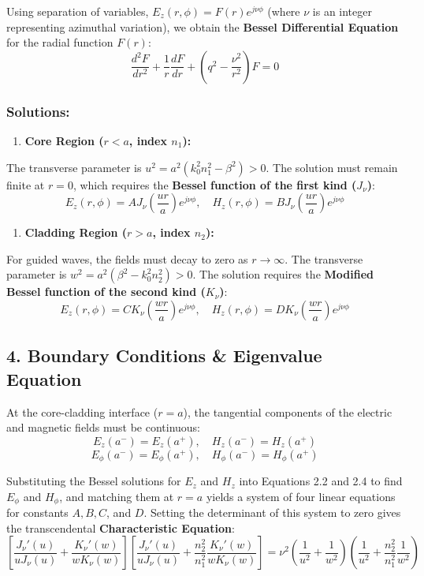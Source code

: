Using separation of variables, $E_z(r, \phi) = F(r) e^{j\nu\phi}$ (where $\nu$ is an integer representing azimuthal variation), we obtain the \textbf{Bessel Differential Equation} for the radial function $F(r)$:
\[ \frac{d^2 F}{dr^2} + \frac{1}{r}\frac{dF}{dr} + \left(q^2 - \frac{\nu^2}{r^2}\right) F = 0 \]

\subsubsection{Solutions:}
\begin{enumerate}
  \item \textbf{Core Region ($r < a$, index $n_1$):}
\end{enumerate}
    The transverse parameter is $u^2 = a^2(k_0^2 n_1^2 - \beta^2) > 0$. The solution must remain finite at $r=0$, which requires the \textbf{Bessel function of the first kind ($J_\nu$)}:
    \[ E_z(r, \phi) = A J_\nu\left(\frac{u r}{a}\right) e^{j\nu\phi}, \quad H_z(r, \phi) = B J_\nu\left(\frac{u r}{a}\right) e^{j\nu\phi} \]
\begin{enumerate}
  \item \textbf{Cladding Region ($r > a$, index $n_2$):}
\end{enumerate}
    For guided waves, the fields must decay to zero as $r \to \infty$. The transverse parameter is $w^2 = a^2(\beta^2 - k_0^2 n_2^2) > 0$. The solution requires the \textbf{Modified Bessel function of the second kind ($K_\nu$)}:
    \[ E_z(r, \phi) = C K_\nu\left(\frac{w r}{a}\right) e^{j\nu\phi}, \quad H_z(r, \phi) = D K_\nu\left(\frac{w r}{a}\right) e^{j\nu\phi} \]


\subsection{4. Boundary Conditions \& Eigenvalue Equation}
At the core-cladding interface ($r = a$), the tangential components of the electric and magnetic fields must be continuous:
\[ E_z(a^-) = E_z(a^+), \quad H_z(a^-) = H_z(a^+) \]
\[ E_\phi(a^-) = E_\phi(a^+), \quad H_\phi(a^-) = H_\phi(a^+) \]

Substituting the Bessel solutions for $E_z$ and $H_z$ into Equations 2.2 and 2.4 to find $E_\phi$ and $H_\phi$, and matching them at $r = a$ yields a system of four linear equations for constants $A, B, C$, and $D$. Setting the determinant of this system to zero gives the transcendental \textbf{Characteristic Equation}:
\[ \left[ \frac{J_\nu'(u)}{u J_\nu(u)} + \frac{K_\nu'(w)}{w K_\nu(w)} \right] \left[ \frac{J_\nu'(u)}{u J_\nu(u)} + \frac{n_2^2}{n_1^2} \frac{K_\nu'(w)}{w K_\nu(w)} \right] = \nu^2 \left( \frac{1}{u^2} + \frac{1}{w^2} \right) \left( \frac{1}{u^2} + \frac{n_2^2}{n_1^2} \frac{1}{w^2} \right) \]

